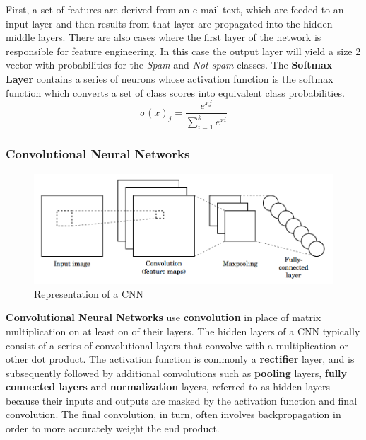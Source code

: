 \documentclass{scrartcl}
\begin{document}
    \newline
    First, a set of features are derived from an e-mail text, which are feeded to an input
    layer and then results from that layer are propagated into the hidden middle layers.
    There are also cases where the first layer of the network is responsible for feature 
    engineering.
    In this case the output layer will yield a size 2 vector with probabilities for the 
    \textit{Spam} and \textit{Not spam} classes.
    The \textbf{Softmax Layer} contains a series of neurons whose activation function is
    the softmax function which converts a set of class scores into equivalent class
    probabilities.
    \begin{equation}
        \sigma(x)_j = \frac{e^{xj}}{\sum^k_{i=1} e^{xi} }
    \end{equation}
    \newpage
    \subsubsection{Convolutional Neural Networks}
    \begin{figure}[h!]
        \centering
        \includegraphics[scale=0.4]{cvnn.png}
        \caption{Representation of a CNN}
    \end{figure} 
    \textbf{Convolutional Neural Networks} use \textbf{convolution} in place of matrix
    multiplication on at least on of their layers. \newline
    The hidden layers of a CNN typically consist of a series of convolutional layers 
    that convolve with a multiplication or other dot product. 
    The activation function is commonly a \textbf{rectifier} layer, 
    and is subsequently followed by  additional convolutions such as \textbf{pooling} layers, 
    \textbf{fully connected layers} and \textbf{normalization} layers, 
    referred to as hidden layers because their inputs and outputs are masked by the activation 
    function and final convolution. The final convolution, in turn, often involves 
    backpropagation in order to more accurately weight the end product.
\end{document}
